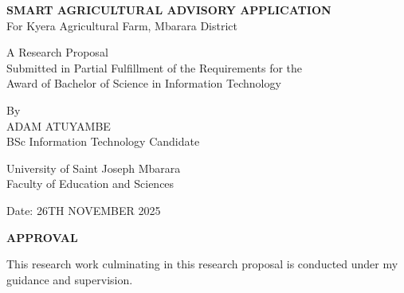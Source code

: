 \documentclass[12pt]{report}
\begin{document}
\begin{titlepage}
    \centering
    \vspace*{1cm}

    {\Huge\bfseries SMART AGRICULTURAL ADVISORY APPLICATION\\}
    \vspace{0.5cm}
    {\Large For Kyera Agricultural Farm, Mbarara District\\}

    \vspace{2cm}

    {\Large A Research Proposal\\}
    \vspace{0.5cm}
    {\Large Submitted in Partial Fulfillment of the Requirements for the\\}
    {\Large Award of Bachelor of Science in Information Technology\\}

    \vspace{2cm}

    {\Large By\\}
    {\Large ADAM ATUYAMBE\\}
    {\large BSc Information Technology Candidate\\}

    \vspace{2cm}

    {\Large University of Saint Joseph Mbarara\\}
    {\Large Faculty of Education and Sciences\\}

    \vspace{2cm}

    {\Large Date: 26TH NOVEMBER 2025\\}

    \vfill
\end{titlepage}

\newpage
\thispagestyle{empty}
\vspace*{2cm}

\begin{center}
    {\Large\bfseries APPROVAL\\}
\end{center}

\vspace{1cm}

This research work culminating in this research proposal is conducted under my guidance and supervision.
\end{document}
